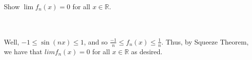Show $\lim f_n(x)=0$ for all $x\in \mathbb{R}$.\\\\

\begin{solution}\renewcommand{\qedsymbol}{}\ \\
    Well, $-1\leq\sin(nx)\leq1$, and so $\frac{-1}{n}\leq f_n(x)\leq\frac1n$. Thus, by Squeeze Theorem,
    we have that $lim f_n(x)=0$ for all $x\in \mathbb{R}$ as desired.

\end{solution}